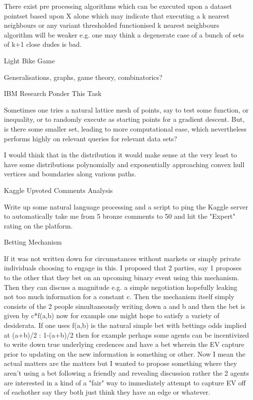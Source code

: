 There exist pre processing algorithms which can be executed upon a dataset pointset based upon X alone which may indicate that executing a k nearest neighbours or any variant thresholded functionised k nearest neighbours algorithm will be weaker e.g. one may think a degenerate case of a bunch of sets of k+1 close dudes is bad.

	Light Bike Game

Generalisations, graphs, game theory, combinatorics?

	IBM Research Ponder This Task

Sometimes one tries a natural lattice mesh of points, say to test some function, or inequality, or to randomly execute as starting points for a gradient descent. But, is there some smaller set, leading to more computational ease, which nevertheless performs highly on relevant queries for relevant data sets?

I would think that in the distribution it would make sense at the very least to have some distributions polynomially and exponentially approaching convex hull vertices and boundaries along various paths.

	Kaggle Upvoted Comments Analysis

Write up some natural language processing and a script to ping the Kaggle server to automatically take me from 5 bronze comments to 50 and hit the "Expert" rating on the platform.

	Betting Mechanism

If it was not written down for circumstances without markets or simply private individuals choosing to engage in this. I proposed that 2 parties, say 1 proposes to the other that they bet on an upcoming binary event using this mechanism. Then they can discuss a magnitude e.g. a simple negotiation hopefully leaking not too much information for a constant c. Then the mechanism itself simply consists of the 2 people simultaneously writing down a and b and then the bet is given by c*f(a,b) now for example one might hope to satisfy a variety of desiderata. If one uses f(a,b) is the natural simple bet with bettings odds implied at (a+b)/2 : 1-(a+b)/2 then for example perhaps some agents can be incentivized to write down true underlying credences and have a bet wherein the EV capture prior to updating on the new information is something or other. Now I mean the actual matters are the matters but I wanted to propose something where they aren't using a bet following a friendly and revealing discussion rather the 2 agents are interested in a kind of a "fair" way to immediately attempt to capture EV off of eachother say they both just think they have an edge or whatever.

